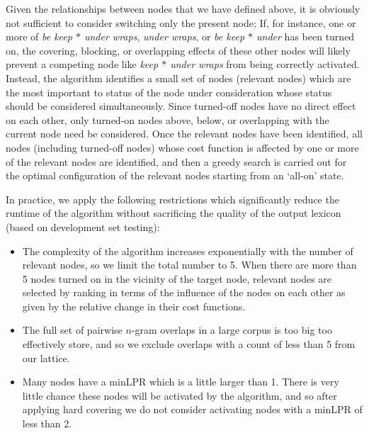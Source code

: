 \documentclass[11pt]{article}
\newcommand{\gap}{$*$\xspace}
\newcommand{\ex}[1]{\textit{#1}\xspace}
\begin{document}

Given the relationships between nodes that we have defined above, it is obviously not sufficient to consider switching only the present node; If, for instance, one or more of \ex{be keep \gap under wraps}, \ex{under wraps}, or \ex{be keep \gap under} has been turned on, the covering, blocking, or overlapping effects of these other nodes will likely prevent a competing node like \ex{keep \gap under wraps} from being correctly activated. Instead, the algorithm identifies a small set of nodes (relevant nodes) which are the most important to status of the node under consideration whose status should be considered simultaneously. Since turned-off nodes have no direct effect on each other, only turned-on nodes above, below, or overlapping with the current node need be considered.  Once the relevant nodes have been identified, all nodes (including turned-off nodes) whose cost function is affected by one or more of the relevant nodes are identified, and then a greedy search is carried out for the optimal configuration of the relevant nodes starting from an `all-on' state. 

In practice, we apply the following restrictions which significantly reduce the runtime of the algorithm without sacrificing the quality of the output lexicon (based on development set testing):

\begin{itemize}
\item The complexity of the algorithm increases exponentially with the number of relevant nodes, so we limit the total number to 5. When there are more than 5 nodes turned on in the vicinity of the target node, relevant nodes are selected by ranking in terms of the influence of the nodes on each other as given by the relative change in their cost functions.
\item The full set of pairwise $n$-gram overlaps in a large corpus is too big too effectively store, and so we exclude overlaps with a count of less than 5 from our lattice.
\item Many nodes have a minLPR which is a little larger than 1. There is very little chance these nodes will be activated by the algorithm, and so after applying hard covering we do not consider activating nodes with a minLPR of less than 2.
\end{itemize}
\end{document}
